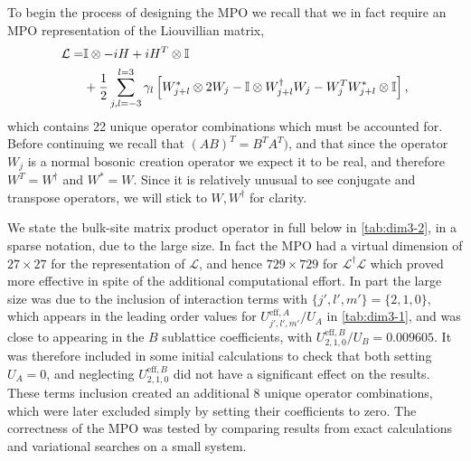 To begin the process of designing the MPO we recall that we in fact require an MPO representation of the Liouvillian matrix,
\begin{align}
	\mathcal{L} = &\mathbb{I} \otimes -iH + iH^{T} \otimes \mathbb{I} \notag \\ 
	&+ \frac{1}{2}\sum_{j,l=-3}^{l=3}\gamma_{l}\left[ W_{j+l}^{*} \otimes 2W_{j} - \mathbb{I} \otimes W_{j+l}^{\dagger}W_{j} - W_{j}^{T}W_{j+l}^{*} \otimes \mathbb{I} \right],
	\label{eq:dim3-4}
\end{align}
which contains 22 unique operator combinations which must be accounted for. Before continuing we recall that \((AB)^{T} = B^{T}A^{T})\), and that since the operator \(W_{j}\) is a normal bosonic creation operator we expect it to be real, and therefore \(W^{T} = W^{\dagger}\) and \(W^{*} = W\). Since it is relatively unusual to see conjugate and transpose operators, we will stick to \(W, W^{\dagger}\) for clarity. 

We state the bulk-site matrix product operator in full below in \cref{tab:dim3-2}, in a sparse notation, due to the large size. In fact the MPO had a virtual dimension of \(27 \times 27\) for the representation of \(\mathcal{L}\), and hence \(729 \times 729\) for \(\mathcal{L}^{\dagger}\mathcal{L}\) which proved more effective in spite of the additional computational effort. In part the large size was due to the inclusion of interaction terms with \(\{j',l',m'\} = \{2,1,0\}\), which appears in the leading order values for \(U^{\mathrm{eff},A}_{j',l',m'} / U_{A}\) in \cref{tab:dim3-1}, and was close to appearing in the \(B\) sublattice coefficients, with \(U^{\mathrm{eff},B}_{2,1,0} / U_{B} = 0.009605\). It was therefore included in some initial calculations to check that both setting \(U_{A} = 0\), and neglecting \(U^{\mathrm{eff},B}_{2,1,0}\) did not have a significant effect on the results. These terms inclusion created an additional 8 unique operator combinations, which were later excluded simply by setting their coefficients to zero. The correctness of the MPO was tested by comparing results from exact calculations and variational searches on a small system.

